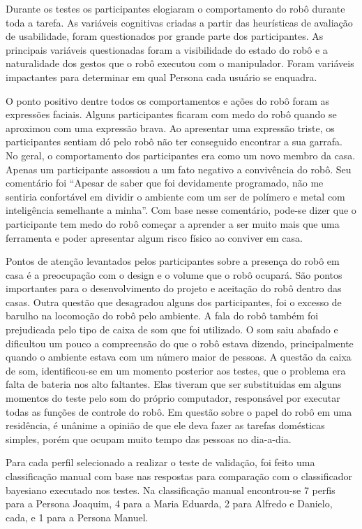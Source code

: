 Durante os testes os participantes elogiaram o comportamento do robô durante toda a tarefa. As variáveis cognitivas criadas a partir das heurísticas de avaliação de usabilidade, foram questionados por grande parte dos participantes. As principais variáveis questionadas foram a visibilidade do estado do robô e a naturalidade dos gestos que o robô executou com o manipulador. Foram variáveis impactantes para determinar em qual Persona cada usuário se enquadra.

O ponto positivo dentre todos os comportamentos e ações do robô foram as expressões faciais. Alguns participantes ficaram com medo do robô quando se aproximou com uma expressão brava. Ao apresentar uma expressão triste, os participantes sentiam dó pelo robô não ter conseguido encontrar a sua garrafa. No geral, o comportamento dos participantes era como um novo membro da casa. Apenas um participante assossiou a um fato negativo a convivência do robô. Seu comentário foi ``Apesar de saber que foi devidamente programado, não me sentiria confortável em dividir o ambiente com um ser de polímero e metal com inteligência semelhante a minha''. Com base nesse comentário, pode-se dizer que o participante tem medo do robô começar a aprender a ser muito  mais que uma ferramenta e poder apresentar algum risco físico ao conviver em casa.

Pontos de atenção levantados pelos participantes sobre a presença do robô em casa é a preocupação com o design e o volume que o robô ocupará. São pontos importantes para o desenvolvimento do projeto e aceitação do robô dentro das casas. Outra questão que desagradou alguns dos participantes, foi o excesso de barulho na locomoção do robô pelo ambiente. A fala do robô também foi prejudicada pelo tipo de caixa de som que foi utilizado. O som saiu abafado e dificultou um pouco a compreensão do que o robô estava dizendo, principalmente quando o ambiente estava com um número maior de pessoas. A questão da caixa de som, identificou-se em um momento posterior aos testes, que o problema era falta de bateria nos alto faltantes. Elas tiveram que ser substituidas em alguns momentos do teste pelo som do próprio computador, responsável por executar todas as funções de controle do robô. Em questão sobre o papel do robô em uma residência, é unânime a opinião de que ele deva fazer as tarefas domésticas simples, porém que ocupam muito tempo das pessoas no dia-a-dia.

Para cada perfil selecionado a realizar o teste de validação, foi feito uma classificação manual com base nas respostas para comparação com o classificador bayesiano executado nos testes. Na classificação manual encontrou-se 7 perfis para a Persona Joaquim, 4 para a Maria Eduarda, 2 para Alfredo e Danielo, cada, e 1 para a Persona Manuel.

